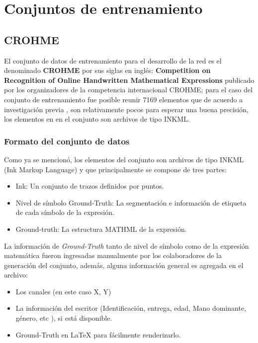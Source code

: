 \newpage
\section{Conjuntos de entrenamiento}

\subsection{CROHME}

El conjunto de datos de entrenamiento para el desarrollo de la red es el denominado \textbf{CROHME} por sus siglas en inglés: \textbf{Competition on Recognition of Online Handwritten Mathematical Expressions} publicado por los organizadores de la competencia internacional CROHME; para el caso del conjunto de entrenamiento fue posible reunir 7169 elementos que de acuerdo a investigación previa \cite{chino}, son relativamente pocos  para esperar una buena precisión, los  elementos en en el conjunto son archivos de tipo INKML.
\subsubsection{Formato del conjunto de datos}

Como ya se mencionó, los elementos del conjunto son archivos de tipo INKML (Ink Markup Language) y que principalmente se compone de tres partes:

\begin{itemize}
	\item Ink: Un conjunto de trazos definidos por puntos.
	\item Nivel de símbolo Ground-Truth: La segmentación e información de etiqueta de cada símbolo de la expresión.
	\item Ground-truth: La estructura MATHML de la expresión.
\end{itemize}

La información de \textit{Ground-Truth} tanto de nivel de símbolo como de la expresión matemática fueron ingresadas manualmente por los colaboradores de la generación del conjunto, además, alguna información general es agregada en el archivo:

\begin{itemize}
	\item Los canales (en este caso X, Y)
	\item La información del escritor (Identificación, entrega, edad, Mano dominante, género, etc ), si está disponible.
	\item Ground-Truth en \LaTeX{} para fácilmente renderizarlo.
\end{itemize} 

